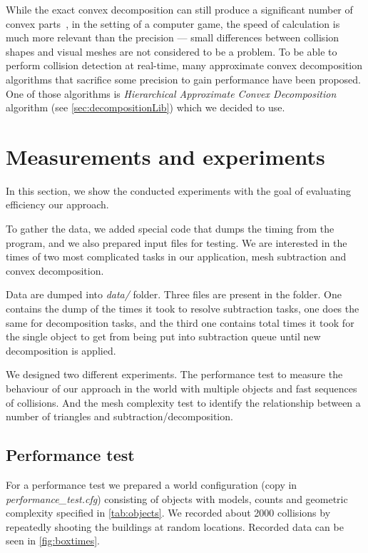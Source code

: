 While the exact convex decomposition can still produce a significant number of convex parts~\cite{convexDecomp}, in the setting of a computer game, the speed of calculation is much more relevant than the precision --- small differences between collision shapes and visual meshes are not considered to be a problem. To be able to perform collision detection at real-time, many approximate convex decomposition algorithms that sacrifice some precision to gain performance have been proposed. One of those algorithms is \emph{Hierarchical Approximate Convex Decomposition} algorithm (see \cref{sec:decompositionLib}) which we decided to use.

\section{Measurements and experiments}
\label{sec:testing}
In this section, we show the conducted experiments with the goal of evaluating efficiency our approach. 

To gather the data, we added special code that dumps the timing from the program, and we also prepared input files for testing. We are interested in the times of two most complicated tasks in our application, mesh subtraction and convex decomposition. 

Data are dumped into \emph{data/} folder. Three files are present in the folder. One contains the dump of the times it took to resolve subtraction tasks, one does the same for decomposition tasks, and the third one contains total times it took for the single object to get from being put into subtraction queue until new decomposition is applied.

We designed two different experiments.  The performance test to measure the behaviour of our approach in the world with multiple objects and fast sequences of collisions. And the mesh complexity test to identify the relationship between a number of triangles and subtraction/decomposition.

\subsection{Performance test}
For a performance test we prepared a world configuration (copy in \emph{performance\_test.cfg}) consisting of objects with models, counts and geometric complexity specified in \cref{tab:objects}.
We recorded about 2000 collisions by repeatedly shooting the buildings at random locations. Recorded data can be seen in \cref{fig:boxtimes}.


